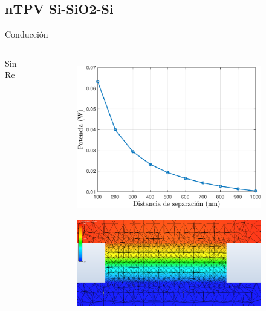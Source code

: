 \documentclass[spanish,a4paper]{beamer}%
\newcommand{\resCondPath}{\graphicspath{{./figuras/Resultados/conduccion/}}}
\begin{document}
	\subsection{nTPV Si-SiO2-Si}
	\begin{frame}{Conducción}
			\resCondPath
			\begin{columns}
					\vspace{-10pt}
					\begin{block}{\centering Sin Rc}
					\end{block}
					\vspace{-10pt}
					\begin{figure}%
							\centering
							\begin{subfigure}[b]{0.9\columnwidth}
									\includegraphics[width=\textwidth]{Pn_SiSiO2Si}
							\end{subfigure}\hfill \vfill
							\begin{subfigure}[b]{0.82\columnwidth}
									\includegraphics[width=\textwidth]{SiSiO2Si_1000nm_Plane2}%

\end{subfigure}
\end{figure}
\end{columns}
\end{frame}
\end{document}
